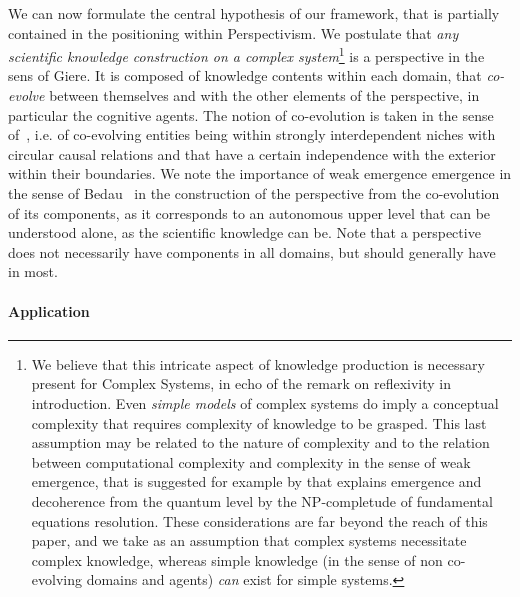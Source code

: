\documentclass[runningheads,a4paper]{llncs2e/llncs}
\begin{document}
We can now formulate the central hypothesis of our framework, that is partially contained in the positioning within Perspectivism. We postulate that \emph{any scientific knowledge construction on a complex system}\footnote{We believe that this intricate aspect of knowledge production is necessary present for Complex Systems, in echo of the remark on reflexivity in introduction. Even \emph{simple models} of complex systems do imply a conceptual complexity that requires complexity of knowledge to be grasped. This last assumption may be related to the nature of complexity and to the relation between computational complexity and complexity in the sense of weak emergence, that is suggested for example by \cite{2014arXiv1403.7686B} that explains emergence and decoherence from the quantum level by the NP-completude of fundamental equations resolution. These considerations are far beyond the reach of this paper, and we take as an assumption that complex systems necessitate complex knowledge, whereas simple knowledge (in the sense of non co-evolving domains and agents) \emph{can} exist for simple systems.} is a perspective in the sens of Giere. It is composed of knowledge contents within each domain, 
 that \emph{co-evolve} between themselves and with the other elements of the perspective, in particular the cognitive agents. The notion of co-evolution is taken in the sense of~\cite{holland2012signals}, i.e. of co-evolving entities being within strongly interdependent niches with circular causal relations and that have a certain independence with the exterior within their boundaries. %
We note the importance of weak emergence emergence in the sense of Bedau~\cite{bedau2002downward} in the construction of the perspective from the co-evolution of its components, as it corresponds to an autonomous upper level that can be understood alone, as the scientific knowledge can be. Note that a perspective does not necessarily have components in all domains, but should generally have in most.






\paragraph{Application}
\end{document}
